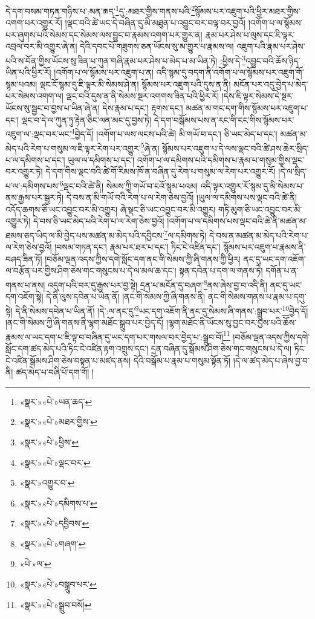 དེ་དག་བསམ་གཏན་གཉིས་པ་:མན་ཆད་\footnote{«སྣར་»«པེ་»ཡན་ཆད་}དུ་:མཐར་གྱིས་གནས་པའི་\footnote{«སྣར་»«པེ་»མཐར་གྱིས་}སྙོམས་པར་འཇུག་པའི་ཕྱིར་མཐར་གྱིས་འགག་པར་འགྱུར་རོ། །ལྡང་བའི་ཚེ་ཡང་དེ་བཞིན་དུ་མི་མཐུན་པ་འབྱུང་བར་བལྟ་བར་བྱའོ། །འགོག་པ་ལ་སྙོམས་པར་ཞུགས་པའི་སེམས་དང་སེམས་ལས་བྱུང་བ་རྣམས་འགག་པར་གྱུར་ན། རྣམ་པར་ཤེས་པ་ལུས་དང་ཇི་ལྟར་འབྲལ་བར་མི་འགྱུར་ཞེ་ན། དེའི་དབང་པོ་གཟུགས་ཅན་ཡོངས་སུ་མ་གྱུར་པ་རྣམས་ལ། འཇུག་པའི་རྣམ་པར་ཤེས་པའི་ས་བོན་གྱིས་ཡོངས་སུ་ཟིན་པ་ཀུན་གཞི་རྣམ་པར་ཤེས་པ་མེད་པ་མ་ཡིན་ཏེ། :ཕྱིས་དེ་\footnote{«སྣར་»«པེ་»ཕྱིས་}འབྱུང་བའི་ཆོས་ཉིད་ཡིན་པའི་ཕྱིར་རོ། །འགོག་པ་ལ་སྙོམས་པར་འཇུག་པ་ན། འདི་སྙམ་དུ་བདག་ནི་འགོག་པ་ལ་སྙོམས་པར་འཇུག་གོ་སྙམ་པའམ། ལྡང་ངོ་སྙམ་དུ་ཇི་ལྟར་མི་སེམས་ཤེ་ན། སྙོམས་པར་འཇུག་པའི་དུས་ན་ནི། མངོན་པར་འདུ་བྱེད་པ་མེད་པར་སེམས་འགག་ལ། ལྡང་བའི་དུས་ན་ནི་སེམས་སྔར་འགགས་ཟིན་པའི་ཕྱིར་རོ། །དེས་ཇི་ལྟར་སེམས་དེ་སྔར་ཡོངས་སུ་སྦྱང་བ་བྱས་པ་ཡིན་ཞེ་ན། དེས་རྣམ་པ་དང་། རྟགས་དང་། མཚན་མ་གང་དག་གིས་སྙོམས་པར་འཇུག་པ་དང་། ལྡང་བ་དེ་ལ་ཀུན་ཏུ་རྟེན་ཅིང་ལན་མང་དུ་བྱས་ཏེ། དེ་དག་བསྒོམས་པས་ན་རང་གི་ངང་གིས་སྙོམས་པར་འཇུག་ལ་:ལྡང་བར་ཡང་\footnote{«སྣར་»«པེ་»ལྡང་བར་}བྱེད་དོ། །འགོག་པ་ལས་ལངས་པའི་ཚེ། མི་གཡོ་བ་དང་། ཅི་ཡང་མེད་པ་དང་། མཚན་མ་མེད་པའི་རེག་པ་གསུམ་ལ་ཇི་ལྟར་རེག་པར་འགྱུར་\footnote{«སྣར་»འགྱུར་བ་}ཞེ་ན། སྙོམས་པར་འཇུག་པ་དེ་ལས་ལྡང་བའི་ཚེ་ཤས་ཆེར་སྲིད་པ་ལ་དམིགས་པ་དང་། ཡུལ་ལ་དམིགས་པ་དང་། འགོག་པ་ལ་དམིགས་པའི་དམིགས་པ་རྣམ་པ་གསུམ་གྱིས་ལྡང་བར་འགྱུར་ཏེ། དེ་དག་གིས་ལྡང་བའི་ཚེ་གོ་རིམས་ཁོ་ན་བཞིན་དུ་རེག་པ་གསུམ་ལ་རེག་པར་འགྱུར་རོ། །དེ་ལ་སྲིད་པ་ལ་:དམིགས་པས་\footnote{«སྣར་»«པེ་»དམིགས་པ་}ལྡང་བའི་ཚེ་ནི། སེམས་ཀྱི་གཡོ་བ་ངའོ་སྙམ་པའམ། འདི་ལྟར་འགྱུར་རོ་སྙམ་དུ་མི་སེམས་པ་ནས་རྒྱས་པར་སྦྱར་ཏེ། དེ་བས་ན་མི་གཡོ་བའི་རེག་པ་ལ་རེག་ཅེས་བྱའོ། །ཡུལ་ལ་དམིགས་པས་ལྡང་བའི་ཚེ་ནི། འདོད་ཆགས་ཅི་ཡང་འབྱུང་བར་མི་འགྱུར། ཞེ་སྡང་ཅི་ཡང་འབྱུང་བར་མི་འགྱུར། གཏི་མུག་ཅི་ཡང་འབྱུང་བར་མི་འགྱུར་ཏེ། དེ་བས་ཅི་ཡང་མེད་པའི་རེག་པ་ལ་རེག་ཅེས་བྱའོ། །འགོག་པ་ལ་དམིགས་པས་ལྡང་བའི་ཚེ་ནི་མཚན་མ་ཐམས་ཅད་ཡིད་ལ་མི་བྱེད་པས་མཚན་མ་མེད་པའི་དབྱིངས་\footnote{«སྣར་»«པེ་»དབྱིབས་}ལ་དམིགས་ཏེ། དེ་བས་ན་མཚན་མ་མེད་པའི་རེག་པ་ལ་རེག་ཅེས་བྱའོ། །བསམ་གཏན་དང་། རྣམ་པར་ཐར་པ་དང་། ཏིང་ངེ་འཛིན་དང་། སྙོམས་པར་འཇུག་པ་རྣམས་ནི་བཤད་ཟིན་ཏོ། །བཅོམ་ལྡན་འདས་ཀྱིས་དགེ་སློང་དག་ནང་གི་སེམས་ཀྱི་ཞི་གནས་ཀྱི་ཕྱིར། ནང་དུ་ཡང་དག་འཇོག་ལ་བརྩོན་པར་གྱིས་ཤིག་ཅེས་གང་གསུངས་པ་དེ་ལ་མལ་ཆ་དང་། སྟན་དབེན་པ་དག་ལ་གནས་ཏེ། དགོན་པ་ན་གནས་པ་ནས། འདུག་པའི་བར་དུ་རྒྱས་པར་བྱ་སྟེ། དྲན་པ་མངོན་དུ་བཞག་\footnote{«སྣར་»«པེ་»གཞག་}ནས་ཞེས་བྱ་བ་འདི་ནི། ནང་དུ་ཡང་དག་འཇོག་སྟེ། དེ་ནི་ལུས་དབེན་པ་ཡིན་ནོ། །ནང་གི་སེམས་ཀྱི་ཞི་གནས་ནི། ནང་གི་སེམས་གནས་པ་རྣམ་པ་དགུ་སྟེ། དེ་ནི་སེམས་དབེན་པ་ཡིན་ནོ། །དེ་:ལ་ནང་དུ་\footnote{«པེ་»ལ་}ཡང་དག་འཇོག་ནི་ནང་དུ་སེམས་ཞི་གནས་:སྒྲུབ་པར་\footnote{«སྣར་»«པེ་»བསྒྲུབ་པར་}བྱེད་དོ། །ནང་གི་སེམས་ཀྱི་ཞི་གནས་ནི་ལྷག་མཐོང་སྒྲུབ་པར་བྱེད་དོ། །ལྷག་མཐོང་ནི་ཡོངས་སུ་བྱང་བར་བྱས་པའི་ཆོས་རྣམས་ལ་ཡང་དག་པ་ཇི་ལྟ་བ་བཞིན་དུ་ཡང་དག་པར་གསལ་བར་བྱེད་པ་:སྒྲུབ་བོ།\footnote{«སྣར་»«པེ་»སྒྲུབ་བསོ།} །བཅོམ་ལྡན་འདས་ཀྱིས་དགེ་སློང་དག་ཚད་མེད་པའི་ཏིང་ངེ་འཛིན་རྟག་འགྲུས་དང་། དྲན་བཞིན་དུ་སྒོམས་ཤིག་ཅེས་གང་གསུངས་པ་དེ་ལ། ཏིང་ངེ་འཛིན་སྒོམས་ཤིག་ཅེས་བསྟན་པ་མཛད་ནས། དེའི་བསྒོམ་པ་རྣམ་པ་གསུམ་སྟོན་ཏོ། །དེ་ལ་ཚད་མེད་པ་ཞེས་བྱ་བ་ནི། ཚད་མེད་པ་བཞི་པོ་དག་གོ། །
